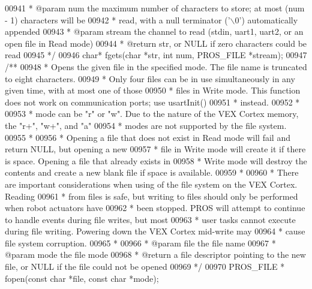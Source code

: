 \begin{DoxyCode}
00941 \textcolor{comment}{ * @param num the maximum number of characters to store; at most (num - 1) characters will be}
00942 \textcolor{comment}{ * read, with a null terminator ('\(\backslash\)0') automatically appended}
00943 \textcolor{comment}{ * @param stream the channel to read (stdin, uart1, uart2, or an open file in Read mode)}
00944 \textcolor{comment}{ * @return str, or NULL if zero characters could be read}
00945 \textcolor{comment}{ */}
00946 \textcolor{keywordtype}{char}* fgets(\textcolor{keywordtype}{char} *str, \textcolor{keywordtype}{int} num, PROS_FILE *stream);
00947 \textcolor{comment}{/**}
00948 \textcolor{comment}{ * Opens the given file in the specified mode. The file name is truncated to eight characters.}
00949 \textcolor{comment}{ * Only four files can be in use simultaneously in any given time, with at most one of those}
00950 \textcolor{comment}{ * files in Write mode. This function does not work on communication ports; use usartInit()}
00951 \textcolor{comment}{ * instead.}
00952 \textcolor{comment}{ *}
00953 \textcolor{comment}{ * mode can be "r" or "w". Due to the nature of the VEX Cortex memory, the "r+", "w+", and "a"}
00954 \textcolor{comment}{ * modes are not supported by the file system.}
00955 \textcolor{comment}{ *}
00956 \textcolor{comment}{ * Opening a file that does not exist in Read mode will fail and return NULL, but opening a new}
00957 \textcolor{comment}{ * file in Write mode will create it if there is space. Opening a file that already exists in}
00958 \textcolor{comment}{ * Write mode will destroy the contents and create a new blank file if space is available.}
00959 \textcolor{comment}{ *}
00960 \textcolor{comment}{ * There are important considerations when using of the file system on the VEX Cortex. Reading}
00961 \textcolor{comment}{ * from files is safe, but writing to files should only be performed when robot actuators have}
00962 \textcolor{comment}{ * been stopped. PROS will attempt to continue to handle events during file writes, but most}
00963 \textcolor{comment}{ * user tasks cannot execute during file writing. Powering down the VEX Cortex mid-write may}
00964 \textcolor{comment}{ * cause file system corruption.}
00965 \textcolor{comment}{ *}
00966 \textcolor{comment}{ * @param file the file name}
00967 \textcolor{comment}{ * @param mode the file mode}
00968 \textcolor{comment}{ * @return a file descriptor pointing to the new file, or NULL if the file could not be opened}
00969 \textcolor{comment}{ */}
00970 PROS_FILE * fopen(\textcolor{keyword}{const} \textcolor{keywordtype}{char} *file, \textcolor{keyword}{const} \textcolor{keywordtype}{char} *mode);

\end{DoxyCode}

